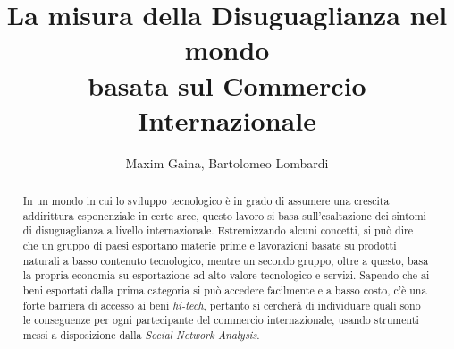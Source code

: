 \documentclass[]{article}
\title{La misura della Disuguaglianza nel mondo\\
	   basata sul Commercio Internazionale}
\author{Maxim Gaina, Bartolomeo Lombardi}
\begin{document}
	\maketitle
	
	\begin{abstract}
		In un mondo in cui lo sviluppo tecnologico è in grado di assumere una crescita addirittura esponenziale in certe aree, questo lavoro si basa sull'esaltazione dei sintomi di disuguaglianza a livello internazionale. Estremizzando alcuni concetti, si può dire che un gruppo di paesi esportano materie prime e lavorazioni basate su prodotti naturali a basso contenuto tecnologico, mentre un secondo gruppo, oltre a questo, basa la propria economia su esportazione ad alto valore tecnologico e servizi. Sapendo che ai beni esportati dalla prima categoria si può accedere facilmente e a basso costo, c'è una forte barriera di accesso ai beni \textit{hi-tech}, pertanto si cercherà di individuare quali sono le conseguenze per ogni partecipante del commercio internazionale, usando strumenti messi a disposizione dalla \textit{Social Network Analysis}.
	\end{abstract}
	
\end{document}
